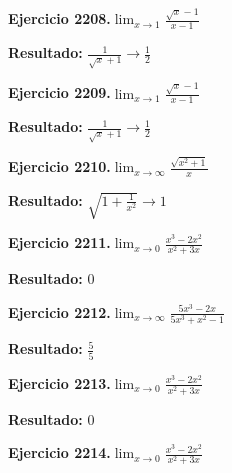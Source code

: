 \documentclass[10pt,a4paper]{article}
\begin{document}
\begin{ejbox}
\textbf{Ejercicio 2208.}\quad $\lim_{x\to 1} \frac{\sqrt{x}-1}{x-1}$
\end{ejbox}

\begin{solbox}
\textbf{Resultado:} \(\displaystyle \frac{1}{\sqrt{x}+1} \to \frac{1}{2}\)
\end{solbox}

\begin{ejbox}
\textbf{Ejercicio 2209.}\quad $\lim_{x\to 1} \frac{\sqrt{x}-1}{x-1}$
\end{ejbox}

\begin{solbox}
\textbf{Resultado:} \(\displaystyle \frac{1}{\sqrt{x}+1} \to \frac{1}{2}\)
\end{solbox}

\newpage
\begin{ejbox}
\textbf{Ejercicio 2210.}\quad $\lim_{x\to \infty} \frac{\sqrt{x^2+1}}{x}$
\end{ejbox}

\begin{solbox}
\textbf{Resultado:} \(\displaystyle \sqrt{1+\frac{1}{x^2}} \to 1\)
\end{solbox}

\begin{ejbox}
\textbf{Ejercicio 2211.}\quad $\lim_{x\to 0} \frac{x^3-2x^2}{x^2+3x}$
\end{ejbox}

\begin{solbox}
\textbf{Resultado:} \(\displaystyle 0\)
\end{solbox}

\begin{ejbox}
\textbf{Ejercicio 2212.}\quad $\lim_{x\to \infty} \frac{5x^3 - 2x}{5x^3 + x^2 - 1}$
\end{ejbox}

\begin{solbox}
\textbf{Resultado:} \(\displaystyle \frac{5}{5}\)
\end{solbox}

\newpage
\begin{ejbox}
\textbf{Ejercicio 2213.}\quad $\lim_{x\to 0} \frac{x^3-2x^2}{x^2+3x}$
\end{ejbox}

\begin{solbox}
\textbf{Resultado:} \(\displaystyle 0\)
\end{solbox}

\begin{ejbox}
\textbf{Ejercicio 2214.}\quad $\lim_{x\to 0} \frac{x^3-2x^2}{x^2+3x}$
\end{ejbox}
\end{document}
